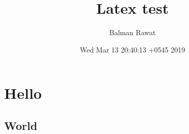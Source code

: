 \documentclass[11pt]{article}
\author{Balman Rawat}
\date{Wed Mar 13 20:40:13 +0545 2019}
\title{Latex test}
\begin{document}
\maketitle
\tableofcontents


\section{Hello}
\label{sec:orge4b8317}
\subsection{World}
\label{sec:org69db9ac}
\end{document}
